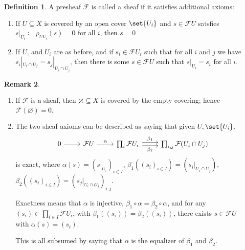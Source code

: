 \documentclass[a4paper]{amsbook}
\theoremstyle{definition}
\newtheorem{definition}{Definition}[chapter]
\newtheorem{remark}[definition]{Remark}
\begin{document}
\begin{definition}
\label{Sheaf}
A presheaf $\mathcal{F}$ is called a sheaf if it satisfies additional axioms:
\begin{enumerate}[label=(S\arabic*)]
	\item If  $U \subseteq X$ is covered by an open cover $\set{U_i}$ and $s \in \mathcal{F}U$ satsfies
		$s|_{U_i}\coloneqq\rho_{UU_i}(s) = 0$ for all $i$, then $s = 0$
	\item If $U$, and $U_i$ are as before, and if $s_i \in \mathcal{F}U_i$ such that
		for all $i$ and $j$ we have $s_i|_{U_i\cap U_j} = s_j|_{U_i \cap U_j}$, then
		there is some $s \in \mathcal{F}U$ such that $s|_{U_i} = s_i$ for all $i$.
\end{enumerate}
\end{definition}

\begin{remark}
\label{SheafRemark}
\begin{enumerate}
	\item If $\mathcal{F}$ is a sheaf, then $\varnothing \subseteq X$ is covered
		by the empty covering; hence $\mathcal{F}(\varnothing) = 0$.
	\item The two sheaf axioms can be described as saying that given $U, \set{U_i}$,
		\[
			\begin{tikzcd}
				0\ar[r] & \mathcal{F}U\ar[r, "\alpha"] & \prod_i \mathcal{F}U_i \ar[r, shift left, "\beta_1"]\ar[r, shift right, "\beta_2" below] & \prod_{i, j} \mathcal{F}(U_i\cap U_j)
			\end{tikzcd}
			\]
			is exact, where $\alpha(s) = (s|_{U_i})_{i \in I}$, $\beta_1((s_i)_{i \in I}) = (s_i|_{U_i \cap U_j})$,
			$\beta_2((s_i)_{i \in I}) = (s_j|_{U_i\cap U_j})_{i, j}$.

			Exactness means that $\alpha$ is injective, $\beta_1\circ\alpha = \beta_2\circ\alpha$,
			and for any $(s_i) \in \prod_{i \in I}\mathcal{F}U_i$, with $\beta_1((s_i)) = \beta_2((s_i))$,
			there exists $s \in \mathcal{F}U$ with $\alpha(s) = (s_i)$.

			This is all subsumed by saying that $\alpha$ is the equalizer of $\beta_1$ and $\beta_2$.
\end{enumerate}
\end{remark}
\end{document}
